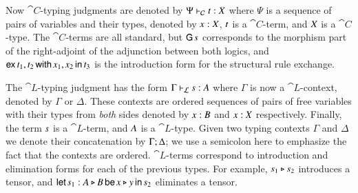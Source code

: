 Now $\cat{C}$-typing judgments are denoted by $\Psi  \vdash_\mathcal{C}  \mathit{t}  :  \mathit{X}$ where
$\Psi$ is a sequence of pairs of variables and their types, denoted by
$\mathit{x}  :  \mathit{X}$, $\mathit{t}$ is a $\cat{C}$-term, and $\mathit{X}$ is a $\cat{C}$-type.  
The $\cat{C}$-terms are all standard, but $ \mathsf{G}\, \mathit{s} $ corresponds to the
morphism part of the right-adjoint of the adjunction between both logics,
and $ \mathsf{ex}\, \mathit{t_{{\mathrm{1}}}} , \mathit{t_{{\mathrm{2}}}} \,\mathsf{with}\, \mathit{x_{{\mathrm{1}}}} , \mathit{x_{{\mathrm{2}}}} \,\mathsf{in}\, \mathit{t_{{\mathrm{3}}}} $ is the introduction form for the
structural rule exchange.

The $\cat{L}$-typing judgment has the form $\Gamma  \vdash_\mathcal{L}  \mathit{s}  :  \mathit{A}$ where $\Gamma$
is now a $\cat{L}$-context, denoted by $\Gamma$ or $\Delta$. These contexts
are ordered sequences of pairs of free variables with their types from
\emph{both} sides denoted by $\mathit{x}  :  \mathit{B}$ and $\mathit{x}  :  \mathit{X}$ respectively.
Finally, the term $\mathit{s}$ is a $\cat{L}$-term, and $\mathit{A}$ is a
$\cat{L}$-type.  Given two typing contexts $\Gamma$ and $\Delta$ we denote
their concatenation by $\Gamma  ;  \Delta$; we use a semicolon here to emphasize the
fact that the contexts are ordered. $\cat{L}$-terms correspond to
introduction and elimination forms for each of the previous types. For
example, $\mathit{s_{{\mathrm{1}}}}  \triangleright  \mathit{s_{{\mathrm{2}}}}$ introduces a tensor, and
$ \mathsf{let}\, \mathit{s_{{\mathrm{1}}}}  :  \mathit{A}  \triangleright  \mathit{B} \,\mathsf{be}\, \mathit{x}  \triangleright  \mathit{y} \,\mathsf{in}\, \mathit{s_{{\mathrm{2}}}} $ eliminates a tensor.

